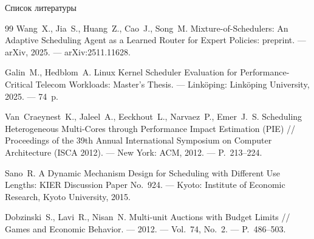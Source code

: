 \documentclass[aspectratio=169,11pt]{beamer}
\begin{document}
\begin{frame}[allowframebreaks]{Список литературы}
\begin{thebibliography}{99}
                Wang~X., Jia~S., Huang~Z., Cao~J., Song~M.
                Mixture-of-Schedulers: An Adaptive Scheduling Agent as a
                Learned Router for Expert Policies: preprint. --- arXiv,
                2025. --- arXiv:2511.11628.

                Galin~M., Hedblom~A. Linux Kernel Scheduler Evaluation
                for Performance-Critical Telecom Workloads: Master's
                Thesis. --- Linköping: Linköping University, 2025. ---
                74~p.

                Van~Craeynest~K., Jaleel~A., Eeckhout~L., Narvaez~P.,
                Emer~J.~S. Scheduling Heterogeneous Multi-Cores through
                Performance Impact Estimation (PIE) // Proceedings of the
                39th Annual International Symposium on Computer
                Architecture (ISCA 2012). --- New York: ACM, 2012. ---
                P.~213--224.

                Sano~R. A Dynamic Mechanism Design for Scheduling with
                Different Use Lengths: KIER Discussion Paper No.~924. ---
                Kyoto: Institute of Economic Research, Kyoto University,
                2015.

                Dobzinski~S., Lavi~R., Nisan~N. Multi-unit Auctions with
                Budget Limits // Games and Economic Behavior. --- 2012. ---
                Vol.~74, No.~2. --- P.~486--503.

        \end{thebibliography}
\end{frame}
\end{document}
